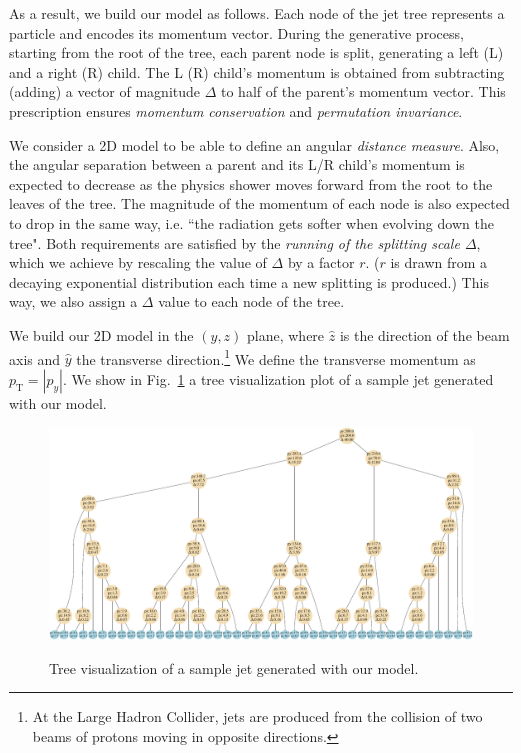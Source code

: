 \documentclass[12pt]{article}
\begin{document}
As a result, we build our model as follows. Each node of the jet tree represents a particle and encodes its momentum vector. During the generative process, starting from the root of the tree, each parent node is split, generating a left (L) and a right (R) child. The L (R) child's momentum is obtained from subtracting (adding) a vector of magnitude $\Delta$ to half of the parent's momentum vector. This prescription ensures {\it momentum conservation} and {\it permutation invariance}.

We consider a 2D model to be able to define an angular {\it distance measure}. Also, the angular separation between a parent and its L/R child's momentum is expected to decrease as the physics shower moves forward from the root to the leaves of the tree. The magnitude of the momentum of each node is also expected to drop in the same way, i.e. ``the radiation gets softer when evolving down the tree".
Both requirements are satisfied by the {\it running of the splitting scale $\Delta$}, which we achieve by rescaling the value of $\Delta$ by a factor $r$. ($r$ is drawn from a decaying exponential distribution each time a new splitting is produced.)  
This way, we also assign a $\Delta$ value to each node of the tree. 


We build our 2D model in the $(y,z)$ plane, where $\hat{z}$ is the direction of the beam axis and $\hat{y}$ the transverse direction.\footnote{At the Large Hadron Collider, jets are produced from the collision of two beams of protons moving in opposite directions.} 
We define the transverse momentum as $p_{\text{T}} =|p_y|$. We show in Fig.~\ref{fig:1DTree} a tree visualization plot of a sample jet generated with our model.

\begin{figure}
{
  \includegraphics[width=0.75\linewidth]{plots/figTruth_jet9}
}
\caption{\small{Tree visualization of a sample jet generated with our model.
}}
\label{fig:1DTree}
\end{figure}
\end{document}
